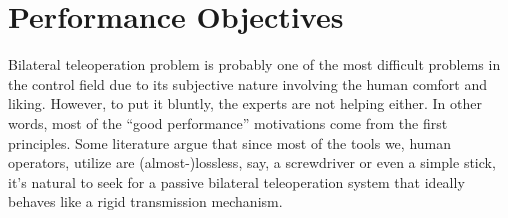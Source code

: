 \chapter{Performance Objectives}
\label{chap:perf}



Bilateral teleoperation problem is probably one of the most difficult problems in the control field due to its 
subjective nature involving the human comfort and liking. However, to put it bluntly, the experts are not helping 
either. In other words, most of the \enquote{good performance} motivations come from the first principles. Some 
literature argue that since most of the tools we, human operators, utilize are (almost-)lossless, say, a 
screwdriver or even a simple stick, it's natural to seek for a passive bilateral teleoperation system that 
ideally behaves like a rigid transmission mechanism. 

